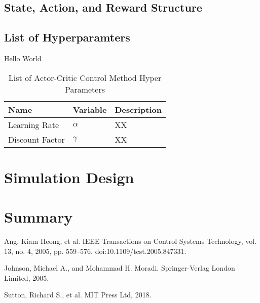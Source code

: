 \documentclass{article}
\begin{document}
\subsection{State, Action, and Reward Structure}

\subsection{List of Hyperparamters}
Hello World

\begin{table}[hbt!]
 \caption{List of Actor-Critic Control Method Hyper Parameters}
  \centering
  \begin{tabular}{lll}
    \toprule
    Name     & Variable     & Description \\
    \midrule
    Learning Rate   &   $\alpha$    & XX     \\
    Discount Factor &   $\gamma$    & XX      \\
    \bottomrule
  \end{tabular}
  \label{tab:table}
\end{table}

\section{Simulation Design}

\section{Summary}

\begin{thebibliography}{1}

Ang, Kiam Heong, et al.
\newblock IEEE Transactions on Control Systems Technology, vol. 13, no. 4, 2005, pp. 559–576.
\newblock doi:10.1109/tcst.2005.847331.

Johnson, Michael A., and Mohammad H. Moradi.
\newblock Springer-Verlag London Limited, 2005.

Sutton, Richard S., et al.
\newblock MIT Press Ltd, 2018.
\newblock

\end{thebibliography}
\end{document}
